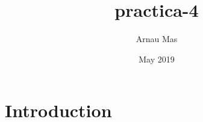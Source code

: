 \documentclass{article}
\title{practica-4}
\author{Arnau Mas}
\date{May 2019}
\begin{document}
\maketitle

\section{Introduction}
\end{document}
